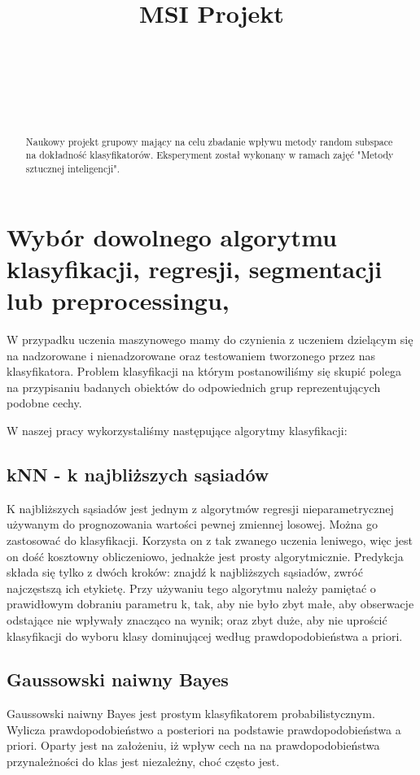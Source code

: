 \documentclass[12pt,onecolumn,technote]{IEEEtran}
\begin{document}
\Large
\title{MSI Projekt}

\author{
\\
\and
{}
\\
\and
{}
\\
\and
}

\maketitle

\begin{abstract}
Naukowy projekt grupowy mający na celu zbadanie wpływu metody random subspace na dokładność klasyfikatorów. Eksperyment został wykonany w ramach zajęć "Metody sztucznej inteligencji".
\end{abstract}
\large

\section{Wybór dowolnego algorytmu klasyfikacji, regresji, segmentacji lub preprocessingu,
}
W przypadku uczenia maszynowego mamy do czynienia z uczeniem dzielącym się na nadzorowane i nienadzorowane oraz testowaniem tworzonego przez nas klasyfikatora. Problem klasyfikacji na którym postanowiliśmy się skupić polega na przypisaniu badanych obiektów do odpowiednich grup reprezentujących podobne cechy.


W naszej pracy wykorzystaliśmy następujące algorytmy klasyfikacji:
\subsection{kNN - k najbliższych sąsiadów}
K najbliższych sąsiadów jest jednym z algorytmów regresji nieparametrycznej używanym do prognozowania wartości pewnej zmiennej losowej. Można go zastosować do klasyfikacji. Korzysta on z tak zwanego uczenia leniwego, więc jest on dość kosztowny obliczeniowo, jednakże jest prosty algorytmicznie. Predykcja składa się tylko z dwóch kroków: znajdź k  najbliższych sąsiadów, zwróć najczęstszą ich etykietę. Przy używaniu tego algorytmu należy pamiętać o prawidłowym dobraniu parametru k, tak, aby nie było zbyt małe, aby obserwacje odstające nie wpływały znacząco na wynik; oraz zbyt duże, aby nie uprościć klasyfikacji do wyboru klasy dominującej według prawdopodobieństwa a priori.
\subsection{Gaussowski naiwny Bayes}
Gaussowski naiwny Bayes jest prostym klasyfikatorem probabilistycznym. Wylicza prawdopodobieństwo a posteriori na podstawie prawdopodobieństwa a priori. Oparty jest na założeniu, iż wpływ cech na na prawdopodobieństwa przynależności do klas jest niezależny, choć często jest.
\end{document}
